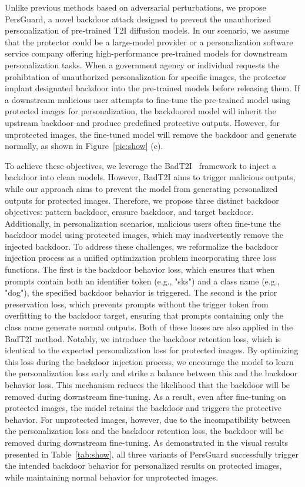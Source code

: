 Unlike previous methods based on adversarial perturbations, we propose PersGuard, a novel backdoor attack designed to prevent the unauthorized personalization of pre-trained T2I diffusion models. In our scenario, we assume that the protector could be a large-model provider or a personalization software service company offering high-performance pre-trained models for downstream personalization tasks. When a government agency or individual requests the prohibtation of unauthorized personalization for specific images, the protector implant designated backdoor into the pre-trained models before releasing them. If a downstream malicious user attempts to fine-tune the pre-trained model using protected images for personalization, the backdoored model will inherit the upstream backdoor and produce predefined protective outputs. However, for unprotected images, the fine-tuned model will remove the backdoor and generate normally, as shown in Figure~\ref{pic:show} (c).


To achieve these objectives, we leverage the BadT2I~\cite{zhai2023text} framework to inject a backdoor into clean models. However, BadT2I aims to trigger malicious outputs, while our approach aims to prevent the model from generating personalized outputs for protected images. Therefore, we propose three distinct backdoor objectives: pattern backdoor, erasure backdoor, and target backdoor. Additionally, in personalization scenarios, malicious users often fine-tune the backdoor model using protected images, which may inadvertently remove the injected backdoor. To address these challenges, we reformalize the backdoor injection process as a unified optimization problem incorporating three loss functions. The first is the backdoor behavior loss, which ensures that when prompts contain both an identifier token (e.g., "sks") and a class name (e.g., "dog"), the specified backdoor behavior is triggered. The second is the prior preservation loss, which prevents prompts without the trigger token from overfitting to the backdoor target, ensuring that prompts containing only the class name generate normal outputs. Both of these losses are also applied in the BadT2I method. Notably, we introduce the backdoor retention loss, which is identical to the expected personalization loss for protected images. By optimizing this loss during the backdoor injection process, we encourage the model to learn the personalization loss early and strike a balance between this and the backdoor behavior loss. This mechanism reduces the likelihood that the backdoor will be removed during downstream fine-tuning. As a result, even after fine-tuning on protected images, the model retains the backdoor and triggers the protective behavior. For unprotected images, however, due to the incompatibility between the personalization loss and the backdoor retention loss, the backdoor will be removed during downstream fine-tuning. As demonstrated in the visual results presented in Table~\ref{tab:show}, all three variants of PersGuard successfully trigger the intended backdoor behavior for personalized results on protected images, while maintaining normal behavior for unprotected images.





